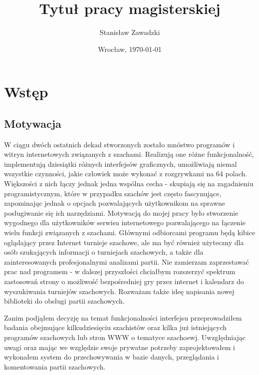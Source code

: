 \documentclass[12pt,leqno]{article}
\title{\LARGE \textbf{Tytuł pracy magisterskiej}}
\author{Stanisław Zawadzki}
\date{Wrocław, \today}
\begin{document}
\maketitle               
\thispagestyle{empty}    
\tableofcontents       
\newpage
\section{Wstęp}

\subsection{Motywacja}
W ciągu dwóch ostatnich dekad stworzonych zostało mnóstwo programów i witryn internetowych związanych z szachami. Realizują one różne funkcjonalność, implementują dziesiątki różnych interfejsów graficznych, umożliwiają niemal wszystkie czynności, jakie człowiek może wykonać z rozgrywkami na 64 polach. Większości z nich łączy jednak jedna wspólna cecha - skupiają się na zagadnieniu programistycznym, które w przypadku szachów jest często fascynujące, zapominając jednak o opcjach pozwalających użytkownikom na sprawne posługiwanie się ich narzędziami. Motywacją do mojej pracy było stworzenie wygodnego dla użytkowników serwisu internetowego pozwalającego na łączenie wielu funkcji związanych z szachami. Głównymi odbiorcami programu będą kibice oglądający przez Internet turnieje szachowe, ale ma być również użyteczny dla osób szukających informacji o turniejach szachowych, a także dla zainteresowanych profesjonalnymi analizami partii. Nie zamierzam zaprzestawać prac nad programem - w dalszej przyszłości chciałbym rozszerzyć spektrum zastosowań strony o możliwość bezpośredniej gry przez internet i kalendarz do wyszukiwania turniejów szachowych. Rozważam także ideę napisania nowej biblioteki do obsługi partii szachowych.

Zanim podjąłem decyzję na temat funkcjonalności interfejsu przeprowadziłem badania obejmujące kilkudziesięciu szachistów oraz kilka już istniejących programów szachowych lub stron WWW o tematyce szachoewj. Uwzględniając uwagi oraz mając we względzie swoje prywatne potrzeby zaprojektowałem i wykonałem system do przechowywania w bazie danych, przeglądania i komentowania partii szachowych.
\end{document}
